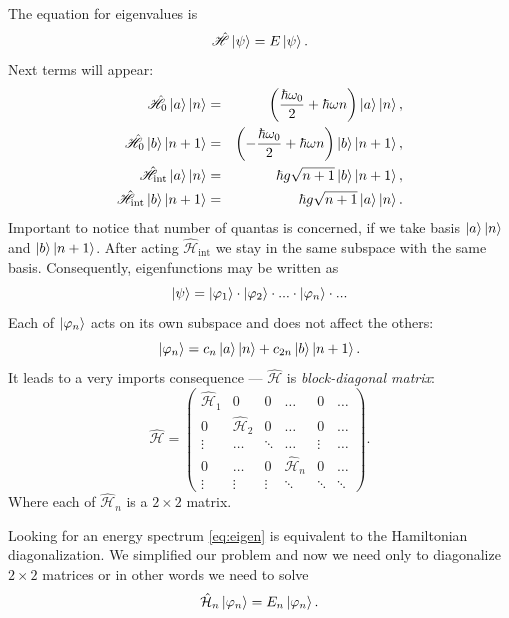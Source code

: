 The equation for eigenvalues is
\begin{equation}
\hat{\mathscr{H}} \left\lvert {\psi} \right\rangle = E \left\lvert {\psi} \right\rangle.
\label{eq:eigen}
\end{equation}
Next terms will appear:
\begin{eqnarray}
	\hat{\mathscr{H}}_0 \left\lvert {a} \right\rangle \left\lvert {n} \right\rangle &=& \left( \frac{\hbar \omega_0}{2} + \hbar \omega n \right) \left\lvert {a} \right\rangle \left\lvert {n} \right\rangle, \\
	\hat{\mathscr{H}}_0 \left\lvert {b} \right\rangle \left\lvert {n+1} \right\rangle &=& \left( -\frac{\hbar \omega_0}{2} + \hbar \omega n \right) \left\lvert {b} \right\rangle \left\lvert {n+1} \right\rangle, \\
	\hat{\mathscr{H}}_{\text{int}} \left\lvert {a} \right\rangle \left\lvert {n} \right\rangle &=& \hbar g \sqrt{n+1} \left\lvert {b} \right\rangle \left\lvert {n+1} \right\rangle, \\
	\hat{\mathscr{H}}_{\text{int}} \left\lvert {b} \right\rangle \left\lvert {n+1} \right\rangle &=& \hbar g \sqrt{n+1} \left\lvert {a} \right\rangle \left\lvert {n} \right\rangle.
\end{eqnarray}
Important to notice that number of quantas is concerned, if we take  basis $\left\lvert {a} \right\rangle \left\lvert {n} \right\rangle$ and $\left\lvert {b} \right\rangle \left\lvert {n+1} \right\rangle$. After acting $\hat{\mathscr{H}}_{\text{int}}$ we stay in the same subspace with the same basis. Consequently, eigenfunctions may be written as
\begin{equation}
	\left\lvert {\psi} \right\rangle = \left\lvert {\varphi_1} \right\rangle \cdot \left\lvert {\varphi_2} \right\rangle \cdot ... \cdot \left\lvert {\varphi_n} \right\rangle \cdot ...
\end{equation}
Each of $\left\lvert {\varphi_n} \right\rangle$ acts on its own subspace and does not affect the others:
\begin{equation}
	\left\lvert {\varphi_n} \right\rangle = c_n \left\lvert {a} \right\rangle \left\lvert {n} \right\rangle + c_{2n} \left\lvert {b} \right\rangle \left\lvert {n+1} \right\rangle.
\end{equation}
It leads to a very imports consequence --- $\hat{\mathscr{H}}$ is \textit{block-diagonal matrix}:
\begin{equation}
	\hat{\mathscr{H}} =
	\begin{pmatrix}
		\hat{\mathcal{H}}_1 & 0 & 0 & \dots & 0 & \dots \\
		0& \hat{\mathcal{H}}_2 &0 & \dots &0 & \dots\\
		\vdots & \dots  & \ddots & \dots & \vdots & \dots \\
		0 & \dots & 0& \hat{\mathcal{H}}_n & 0 & \dots \\
		\vdots & \vdots & \vdots & \ddots & \ddots & \ddots
	\end{pmatrix}.
\end{equation}
Where each of $\hat{\mathcal{H}}_n$ is a $2\times2$ matrix.

Looking for an energy spectrum \eqref{eq:eigen} is equivalent to the Hamiltonian diagonalization.
We simplified our problem and now we need only to diagonalize $2 \times 2$ matrices or in other words we need to solve
\begin{equation}
	\hat{\mathcal{H}}_n \left\lvert {\varphi_n} \right\rangle = E_n \left\lvert {\varphi_n} \right\rangle.
\end{equation}

